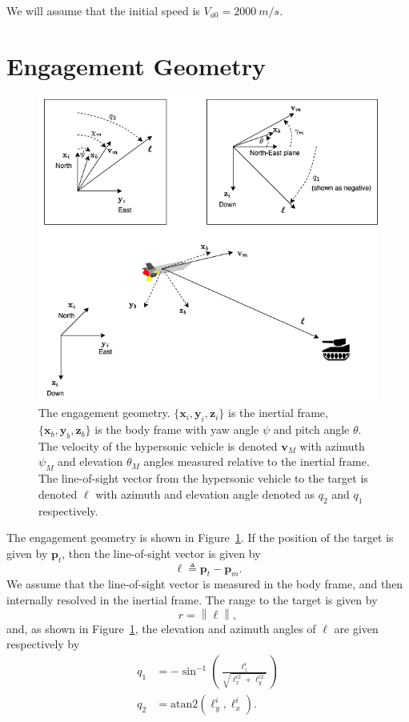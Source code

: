\documentclass{article}
\newcommand{\norm}[1]{\left\|#1\right\|}
\newcommand{\pbf}{\mathbf{p}}
\newcommand{\vbf}{\mathbf{v}}
\newcommand{\xbf}{\mathbf{x}}
\newcommand{\ybf}{\mathbf{y}}
\newcommand{\zbf}{\mathbf{z}}
\newcommand{\ellbf}{\boldsymbol{\ell}}
\begin{document}
We will assume that the initial speed is $V_{a0} = 2000~m/s$. 



\section{Engagement Geometry}

\begin{figure}[htb]
  \includegraphics[width=0.90\linewidth]{./figures/los_geometry.png}
  \caption{The engagement geometry.  $\{\xbf_i, \ybf_i, \zbf_i\}$ is the inertial frame, $\{\xbf_b, \ybf_b, \zbf_b\}$ is the body frame with yaw angle $\psi$ and pitch angle $\theta$.  The velocity of the hypersonic vehicle is denoted $\vbf_M$ with azimuth $\psi_M$ and elevation $\theta_M$ angles measured relative to the inertial frame.  The line-of-sight vector from the hypersonic vehicle to the target is denoted $\boldsymbol{\ell}$ with azimuth and elevation angle denoted as $q_2$ and $q_1$ respectively.}
  \label{fig:los_geometry}
\end{figure}

The engagement geometry is shown in Figure~\ref{fig:los_geometry}.  If the position of the target is given by
$\pbf_t$, then the line-of-sight vector is given by
\[
\ellbf\triangleq \pbf_t - \pbf_m.
\]
We assume that the line-of-sight vector is measured in the body frame, and then internally resolved in the inertial frame.  The range to the target is given by
\[
r = \norm{\ellbf},
\]
and, as shown in Figure~\ref{fig:los_geometry}, the elevation and azimuth angles of $\boldsymbol{\ell}$ are given respectively by
\begin{align*}
	q_1 &= -\sin^{-1}\left(\frac{\ellbf^i_z}{\sqrt{\ellbf^{i2}_x+\ellbf^{i2}_y}}\right)\\
	q_2 &= \text{atan2}(\ell^i_y, \ellbf^i_x).
\end{align*}
\end{document}
